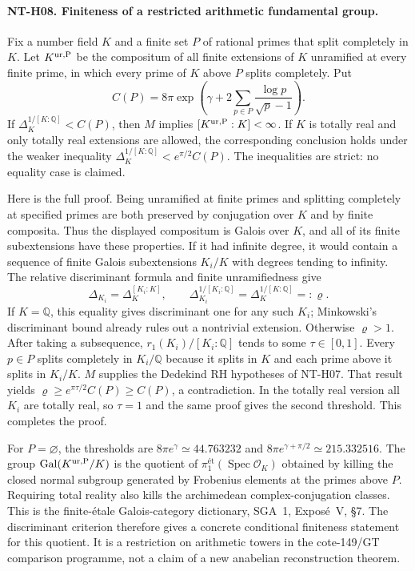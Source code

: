 \documentclass[11pt,a4paper]{article}
\begin{document}
\paragraph{NT-H08. Finiteness of a restricted arithmetic fundamental group.}
Fix a number field $K$ and a finite set $P$ of rational primes that
split completely in $K$.  Let $K^{\rm ur,P}$ be the compositum of all
finite extensions of $K$ unramified at every finite prime, in which
every prime of $K$ above $P$ splits completely.  Put
\[
 C(P)=8\pi\exp\left(\gamma+
                 2\sum_{p\in P}\frac{\log p}{\sqrt p-1}\right).
\]
If $\Delta_K^{1/[K:\mathbb Q]}<C(P)$, then $M$ implies
$[K^{\rm ur,P}:K]<\infty$.
If $K$ is totally real and only totally real extensions are allowed,
the corresponding conclusion holds under the weaker inequality
$\Delta_K^{1/[K:\mathbb Q]}<e^{\pi/2}C(P)$.
The inequalities are strict: no equality case is claimed.

Here is the full proof.  Being unramified at finite primes and splitting
completely at specified primes are both preserved by conjugation over
$K$ and by finite composita.  Thus the displayed compositum is Galois
over $K$, and all of its finite subextensions have these properties.
If it had infinite degree, it would contain a sequence of finite
Galois subextensions $K_i/K$ with degrees tending to infinity.
The relative discriminant formula and finite unramifiedness give
\[
 \Delta_{K_i}=\Delta_K^{[K_i:K]},\qquad
 \Delta_{K_i}^{1/[K_i:\mathbb Q]}=
                  \Delta_K^{1/[K:\mathbb Q]}=: \varrho.
\]
If $K=\mathbb Q$, this equality gives discriminant one for any such
$K_i$; Minkowski's discriminant bound already rules out a nontrivial
extension.  Otherwise $\varrho>1$.
After taking a subsequence, $r_1(K_i)/[K_i:\mathbb Q]$ tends to some
$\tau\in[0,1]$.  Every $p\in P$ splits completely in $K_i/\mathbb Q$
because it splits in $K$ and each prime above it splits in $K_i/K$.
$M$ supplies the Dedekind RH hypotheses of NT-H07.  That result yields
$\varrho\ge e^{\pi\tau/2}C(P)\ge C(P)$, a contradiction.
In the totally real version all $K_i$ are totally real, so $\tau=1$
and the same proof gives the second threshold.  This completes the proof.

For $P=\varnothing$, the thresholds are
$8\pi e^\gamma\simeq44.763232$ and
$8\pi e^{\gamma+\pi/2}\simeq215.332516$.
The group $\operatorname{Gal}(K^{\rm ur,P}/K)$ is the quotient of
$\pi_1^{\text{ét}}(\operatorname{Spec}\mathcal O_K)$ obtained by
killing the closed normal subgroup generated by Frobenius elements at
the primes above $P$.  Requiring total reality also kills the
archimedean complex-conjugation classes.  This is the finite-\'{e}tale
Galois-category dictionary, SGA~1, Expos\'e~V, \S7.  The discriminant
criterion therefore gives a concrete conditional finiteness statement
for this quotient.  It is a restriction on arithmetic towers in the
cote-149/GT comparison programme, not a claim of a new anabelian
reconstruction theorem.
\end{document}
